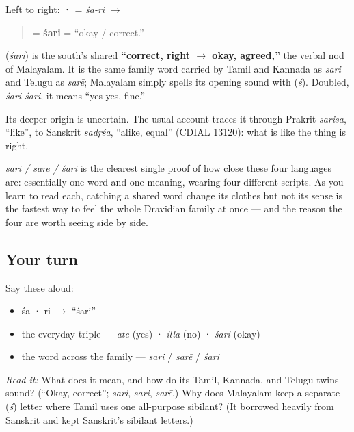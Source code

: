 Left to right: \textbf{ · } = \emph{śa-ri} $\to$

\begin{quote}
\textbf{} = \textbf{śari} = \textquotedblleft{}okay / correct.\textquotedblright{}
\end{quote}

\begin{cousinweb}
\textbf{} (\emph{śari}) is the south's shared \textbf{\textquotedblleft{}correct, right $\to$ okay, agreed,\textquotedblright{}} the verbal nod of Malayalam. It is the same family word carried by Tamil and Kannada as \emph{sari} and Telugu as \emph{sarē}; Malayalam simply spells its opening sound with \textbf{} (\emph{ś}). Doubled, \emph{śari śari}, it means \textquotedblleft{}yes yes, fine.\textquotedblright{}

Its deeper origin is uncertain. The usual account traces it through Prakrit \emph{sarisa}, \textquotedblleft{}like\textquotedblright{}, to Sanskrit \emph{sadṛśa}, \textquotedblleft{}alike, equal\textquotedblright{} (CDIAL 13120): what is like the thing is right.
\end{cousinweb}

\begin{grammarlens}[title={Grammar Lens: one word, four scripts}]
\emph{sari / sarē / śari} is the clearest single proof of how close these four languages are: essentially one word and one meaning, wearing four different scripts. As you learn to read each, catching a shared word change its clothes but not its sense is the fastest way to feel the whole Dravidian family at once — and the reason the four are worth seeing side by side.
\end{grammarlens}

\subsection*{Your turn}
Say these aloud:

\begin{itemize}
\raggedright
  \item śa · ri $\to$ \textquotedblleft{}śari\textquotedblright{}
  \item the everyday triple — \emph{ate} (yes) · \emph{illa} (no) · \emph{śari} (okay)
  \item the word across the family — \emph{sari} / \emph{sarē} / \emph{śari}
\end{itemize}

\begin{tcolorbox}[breakable,colback=teal!4,colframe=teal!35!black,title={Before you move on}]
\emph{Read it:} \textbf{} What does it mean, and how do its Tamil, Kannada, and Telugu twins sound? (\textquotedblleft{}Okay, correct\textquotedblright{}; \emph{sari}, \emph{sari}, \emph{sarē}.) Why does Malayalam keep a separate \textbf{} (\emph{ś}) letter where Tamil uses one all-purpose sibilant? (It borrowed heavily from Sanskrit and kept Sanskrit's sibilant letters.)
\end{tcolorbox}
